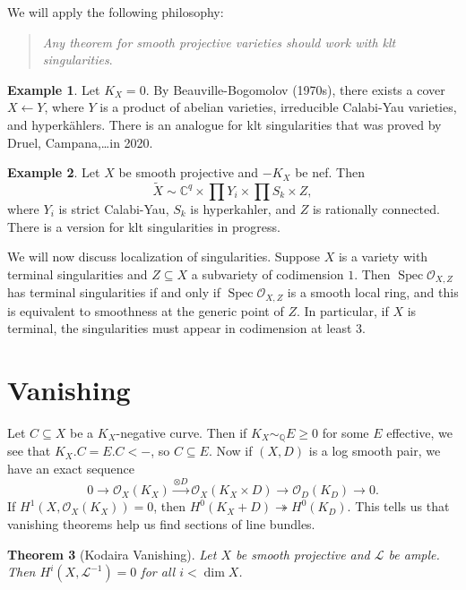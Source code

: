 \documentclass[leqno, openany]{memoir}
\newtheorem{thm}{Theorem}[section]
\theoremstyle{definition}
\newtheorem{exm}[thm]{Example}
\theoremstyle{remark}
\theoremstyle{plain}
\theoremstyle{definition}
\theoremstyle{remark}
\newcommand{\C}{\mathbb{C}}
\newcommand{\Q}{\mathbb{Q}}
\newcommand{\mc}[1]{\mathcal{#1}}
\newcommand{\wt}[1]{\widetilde{#1}}
\DeclareMathOperator{\Spec}{Spec}
\begin{document}
We will apply the following philosophy: 
\begin{quotation}
    \textit{Any theorem for smooth projective varieties should work with klt singularities}. 
\end{quotation}

\begin{exm}
    Let $K_X = 0$. By Beauville-Bogomolov (1970s), there exists a cover $X \gets Y$, where $Y$ is a product of abelian varieties, irreducible Calabi-Yau varieties, and hyperk\"ahlers. There is an analogue for klt singularities that was proved by Druel, Campana,\ldots in 2020.
\end{exm}

\begin{exm}
    Let $X$ be smooth projective and $-K_X$ be nef. Then 
    \[ \wt{X} \sim \C^q \times \prod Y_i \times \prod S_k \times Z, \]
    where $Y_i$ is strict Calabi-Yau, $S_k$ is hyperkahler, and $Z$ is rationally connected. There is a version for klt singularities in progress.
\end{exm}

We will now discuss localization of singularities. Suppose $X$ is a variety with terminal singularities and $Z \subseteq X$ a subvariety of codimension $1$. Then $\Spec \mc{O}_{X,Z}$ has terminal singularities if and only if $\Spec \mc{O}_{X,Z}$ is a smooth local ring, and this is equivalent to smoothness at the generic point of $Z$. In particular, if $X$ is terminal, the singularities must appear in codimension at least $3$.

\section{Vanishing}%
\label{sec:vanishing}

Let $C \subseteq X$ be a $K_X$-negative curve. Then if $K_X \sim_{\Q} E \geq 0$ for some $E$ effective, we see that $K_X.C = E.C < -$, so $C \subseteq E$. Now if $(X, D)$ is a log smooth pair, we have an exact sequence
\[ 0 \to \mc{O}_X(K_X) \xrightarrow{\otimes D} \mc{O}_X (K_X \times D) \to \mc{O}_D(K_D) \to 0. \]
If $H^1(X, \mc{O}_X(K_X)) = 0$, then $H^0(K_X + D) \twoheadrightarrow H^0(K_D)$. This tells us that vanishing theorems help us find sections of line bundles.

\begin{thm}[Kodaira Vanishing]
    Let $X$ be smooth projective and $\mc{L}$ be ample. Then $H^i(X, \mc{L}^{-1}) = 0$ for all $i < \dim X$.
\end{thm}
\end{document}
